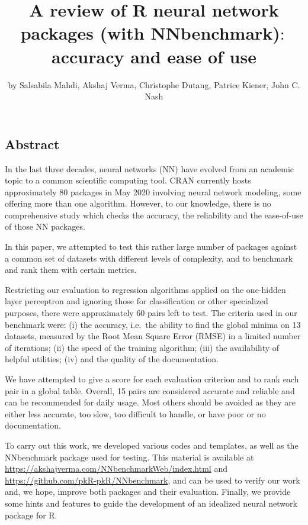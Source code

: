\title{A review of R neural network packages (with NNbenchmark)\(:\)
accuracy and ease of use}
\author{by Salsabila Mahdi, Akshaj Verma, Christophe Dutang, Patrice
Kiener, John C. Nash}

\maketitle


\hypertarget{abstract}{%
\subsection{Abstract}\label{abstract}}

In the last three decades, neural networks (NN) have evolved from an
academic topic to a common scientific computing tool. CRAN currently
hosts approximately 80 packages in May 2020 involving neural network
modeling, some offering more than one algorithm. However, to our
knowledge, there is no comprehensive study which checks the accuracy,
the reliability and the ease-of-use of those NN packages.

In this paper, we attempted to test this rather large number of packages
against a common set of datasets with different levels of complexity,
and to benchmark and rank them with certain metrics.

Restricting our evaluation to regression algorithms applied on the
one-hidden layer perceptron and ignoring those for classification or
other specialized purposes, there were approximately 60
 pairs left to test. The criteria used in our
benchmark were: (i) the accuracy, i.e.~the ability to find the global
minima on 13 datasets, measured by the Root Mean Square Error (RMSE) in
a limited number of iterations; (ii) the speed of the training
algorithm; (iii) the availability of helpful utilities; (iv) and the
quality of the documentation.

We have attempted to give a score for each evaluation criterion and to
rank each  pair in a global table. Overall, 15
pairs are considered accurate and reliable and can be recommended for
daily usage. Most others should be avoided as they are either less
accurate, too slow, too difficult to handle, or have poor or no
documentation.

To carry out this work, we developed various codes and templates, as
well as the NNbenchmark package used for testing. This material is
available at \url{https://akshajverma.com/NNbenchmarkWeb/index.html} and
\url{https://github.com/pkR-pkR/NNbenchmark}, and can be used to verify
our work and, we hope, improve both packages and their evaluation.
Finally, we provide some hints and features to guide the development of
an idealized neural network package for R.

